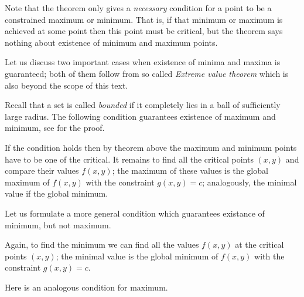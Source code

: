 Note that the theorem only gives a \emph{necessary} condition
for a point to be a constrained maximum or minimum.
That is, if that minimum or maximum is achieved at some point 
then this point must be critical,
but the theorem says nothing about existence of minimum and maximum points.  

Let us discuss two important cases when existence of minima and maxima is guaranteed; both of them follow from so called \emph{Extreme value theorem} which is also beyond the scope of this
text.

Recall that a set is called \emph{bounded} if it completely lies in a ball of sufficiently large radius.
The following condition guarantees existence of maximum and minimum, see \cite{tm} for the proof.

\smallskip


\smallskip

\noindent If the condition holds then by theorem above the maximum and minimum points have to be one of the critical.
It remains to find all the critical points $(x,y)$
and compare their values $f(x,y)$;
the maximum of these values is the global maximum of $f(x,y)$ with the constraint $g(x,y)=c$;
analogously, the minimal value if the global minimum.

Let us formulate a more general condition which guarantees existance of minimum, but not maximum.

\smallskip


\smallskip

\noindent Again, to find the minimum 
we can find all the values $f(x,y)$
 at the critical points $(x,y)$;
 the minimal value is the global minimum of $f(x,y)$ with the constraint $g(x,y)=c$.
 
Here is an analogous condition for maximum.

\smallskip


